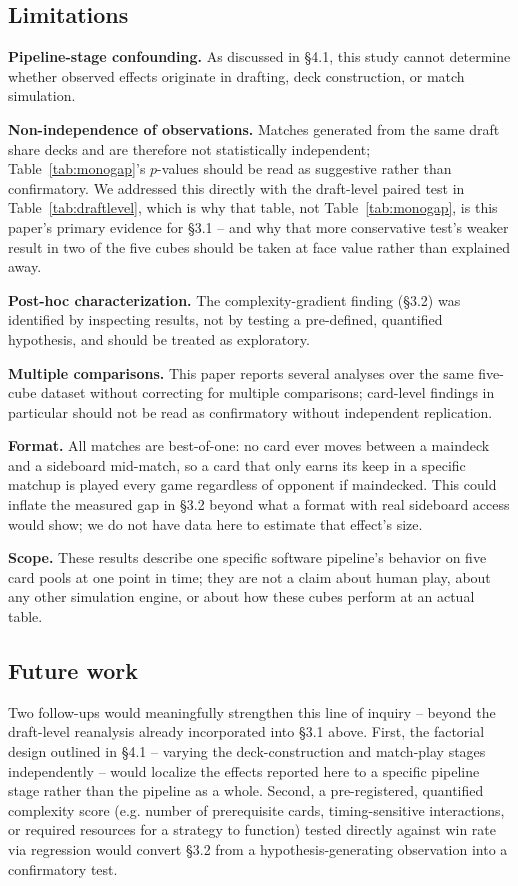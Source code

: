 \documentclass[11pt]{article}
\begin{document}
\subsection{Limitations}

\textbf{Pipeline-stage confounding.} As discussed in \S4.1, this study cannot
determine whether observed effects originate in drafting, deck construction, or
match simulation.

\textbf{Non-independence of observations.} Matches generated from the same draft
share decks and are therefore not statistically independent; Table~\ref{tab:monogap}'s
$p$-values should be read as suggestive rather than confirmatory. We addressed
this directly with the draft-level paired test in Table~\ref{tab:draftlevel},
which is why that table, not Table~\ref{tab:monogap}, is this paper's primary
evidence for \S3.1 -- and why that more conservative test's weaker result in two
of the five cubes should be taken at face value rather than explained away.

\textbf{Post-hoc characterization.} The complexity-gradient finding (\S3.2) was
identified by inspecting results, not by testing a pre-defined, quantified
hypothesis, and should be treated as exploratory.

\textbf{Multiple comparisons.} This paper reports several analyses over the same
five-cube dataset without correcting for multiple comparisons; card-level
findings in particular should not be read as confirmatory without independent
replication.

\textbf{Format.} All matches are best-of-one: no card ever moves between a
maindeck and a sideboard mid-match, so a card that only earns its keep in a
specific matchup is played every game regardless of opponent if maindecked. This
could inflate the measured gap in \S3.2 beyond what a format with real sideboard
access would show; we do not have data here to estimate that effect's size.

\textbf{Scope.} These results describe one specific software pipeline's behavior
on five card pools at one point in time; they are not a claim about human play,
about any other simulation engine, or about how these cubes perform at an actual
table.

\subsection{Future work}

Two follow-ups would meaningfully strengthen this line of inquiry -- beyond the
draft-level reanalysis already incorporated into \S3.1 above. First, the
factorial design outlined in \S4.1 -- varying the
deck-construction and match-play stages independently -- would localize the
effects reported here to a specific pipeline stage rather than the pipeline as a
whole. Second, a pre-registered, quantified complexity score (e.g. number of
prerequisite cards, timing-sensitive interactions, or required resources for a
strategy to function) tested directly against win rate via regression would
convert \S3.2 from a hypothesis-generating observation into a confirmatory test.
\end{document}
